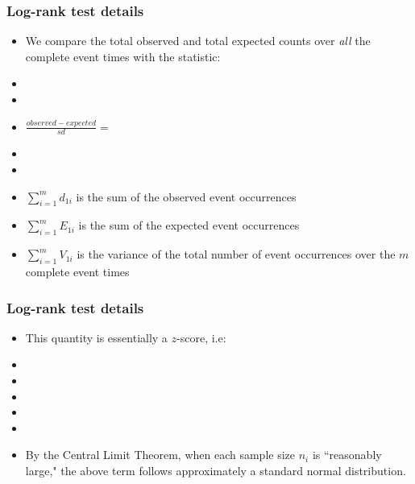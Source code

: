 \begin{frame}
\frametitle{Log-rank test details}
\begin{itemize}
\item[] We compare the total observed and total expected counts over \textit{all} the
complete event times with the statistic:
\item[]
\item[]
\item[]$\displaystyle \frac{observed - expected}{sd} = $
\item[]
\item[]

\item $\sum_{i=1}^md_{1i}$ is the sum of the observed event occurrences
\item $\sum_{i=1}^mE_{1i}$ is the sum of the expected event occurrences
\item $\sum_{i=1}^mV_{1i}$ is the variance of the total number of event occurrences over the $m$ complete event times

\end{itemize}
\end{frame}


\begin{frame}
\frametitle{Log-rank test details}
\begin{itemize}
\item This quantity is essentially a $z$-score, i.e:
\item[]
\item[]
\item[]
\item[]
\item[]
\item By the Central Limit Theorem, when each sample size $n_i$ is ``reasonably large," the above term
follows approximately a standard normal distribution.
\end{itemize}
\end{frame}


